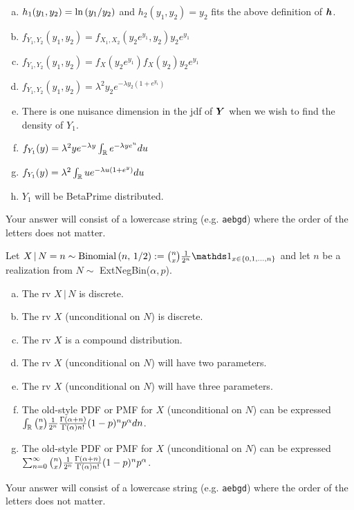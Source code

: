 \documentclass[12pt,landscape]{article}
\newcommand{\instr}{\small Your answer will consist of a lowercase string (e.g. \texttt{aebgd}) where the order of the letters does not matter. \normalsize}
\begin{document}
\begin{enumerate}[(a)]
\item $h_1(y_1, y_2) = \ln\left(y_1 / y_2\right)$ and $h_2(y_1, y_2) = y_2$ fits the above definition of $\boldsymbol{h}$.
\item $f_{Y_1, Y_2}(y_1, y_2) = f_{X_1, X_2}(y_2 e^{y_1}, y_2) y_2e^{y_1}$ 
\item $f_{Y_1, Y_2}(y_1, y_2) = f_{X}(y_2 e^{y_1})f_X(y_2) y_2e^{y_1}$ 
\item $f_{Y_1, Y_2}(y_1, y_2) = \lambda^2 y_2 e^{-\lambda y_2(1+e^{y_1})}$
\item There is one nuisance dimension in the jdf of $\boldsymbol{Y}$ when we wish to find the density of $Y_1$. 
\item $f_{Y_1}(y) = \lambda^2 ye^{-\lambda y} \int_{\mathbb{R}} e^{-\lambda y e^{u} } du$ 
\item $f_{Y_1}(y) = \lambda^2 \int_{\mathbb{R}} u e^{-\lambda u(1+e^{y})} du$ 
\item $Y_1$ will be BetaPrime distributed.
\end{enumerate}
\eenum\instr\pagebreak


\problem{} Let $X\,|\,N=n \sim \binomial{n}{1/2} := \binom{n}{x} \oneover{2^n} \indic{x \in \braces{0,1,...,n}}$ and let $n$ be a realization from $N \sim$ ExtNegBin($\alpha, p$).

\vspace{-0.2cm}\benum{} 

\begin{enumerate}[(a)]
\item The rv $X\,|\,N$ is discrete.
\item The rv $X$ (unconditional on $N$) is discrete.
\item The rv $X$ is a compound distribution.
\item The rv $X$ (unconditional on $N$) will have two parameters.
\item The rv $X$ (unconditional on $N$) will have three parameters.
\item The old-style PDF or PMF for $X$ (unconditional on $N$) can be expressed $\int_{\mathbb{R}} \binom{n}{x} \frac{1}{2^n}   \frac{\Gamma\left(\alpha + n\right)}{\Gamma\left(\alpha\right) n!} (1-p)^n p^\alpha dn$.
\item The old-style PDF or PMF for $X$ (unconditional on $N$) can be expressed $\sum_{n=0}^\infty \binom{n}{x} \frac{1}{2^n} \frac{\Gamma\left(\alpha + n\right)}{\Gamma\left(\alpha\right) n!} (1-p)^n p^\alpha$.
\end{enumerate}
\eenum\instr\pagebreak

\end{document}
